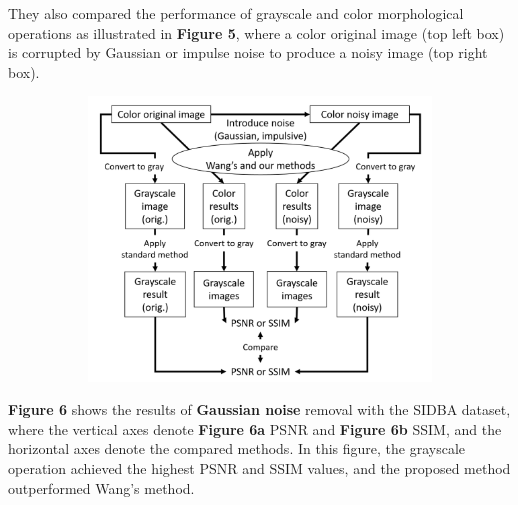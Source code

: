 They also compared the performance of grayscale and color morphological operations as illustrated in \textbf{Figure 5}, where a color original image (top left box) is corrupted by Gaussian or impulse noise to produce a noisy image (top right box).

\begin{figure}[H]
    \centering
    \begin{subfigure}[t]{.9\textwidth}
    \includegraphics[width=0.9\linewidth]{images/result/flow.png}
    \centering
    \end{subfigure}
    \caption{}
\end{figure}

\textbf{Figure 6} shows the results of \textbf{Gaussian noise} removal with the SIDBA dataset, where the vertical axes denote \textbf{Figure 6a} PSNR and\textbf{ Figure 6b} SSIM, and the horizontal axes denote the compared methods. In this figure, the grayscale operation achieved the highest PSNR and SSIM values, and the proposed method outperformed Wang’s method.

